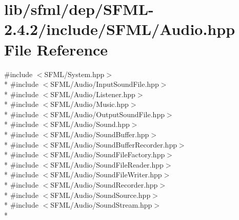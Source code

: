 \hypertarget{sfml_2dep_2_s_f_m_l-2_84_82_2include_2_s_f_m_l_2_audio_8hpp}{\section{lib/sfml/dep/\-S\-F\-M\-L-\/2.4.2/include/\-S\-F\-M\-L/\-Audio.hpp File Reference}
\label{sfml_2dep_2_s_f_m_l-2_84_82_2include_2_s_f_m_l_2_audio_8hpp}
}
{\ttfamily \#include $<$S\-F\-M\-L/\-System.\-hpp$>$}\\*
{\ttfamily \#include $<$S\-F\-M\-L/\-Audio/\-Input\-Sound\-File.\-hpp$>$}\\*
{\ttfamily \#include $<$S\-F\-M\-L/\-Audio/\-Listener.\-hpp$>$}\\*
{\ttfamily \#include $<$S\-F\-M\-L/\-Audio/\-Music.\-hpp$>$}\\*
{\ttfamily \#include $<$S\-F\-M\-L/\-Audio/\-Output\-Sound\-File.\-hpp$>$}\\*
{\ttfamily \#include $<$S\-F\-M\-L/\-Audio/\-Sound.\-hpp$>$}\\*
{\ttfamily \#include $<$S\-F\-M\-L/\-Audio/\-Sound\-Buffer.\-hpp$>$}\\*
{\ttfamily \#include $<$S\-F\-M\-L/\-Audio/\-Sound\-Buffer\-Recorder.\-hpp$>$}\\*
{\ttfamily \#include $<$S\-F\-M\-L/\-Audio/\-Sound\-File\-Factory.\-hpp$>$}\\*
{\ttfamily \#include $<$S\-F\-M\-L/\-Audio/\-Sound\-File\-Reader.\-hpp$>$}\\*
{\ttfamily \#include $<$S\-F\-M\-L/\-Audio/\-Sound\-File\-Writer.\-hpp$>$}\\*
{\ttfamily \#include $<$S\-F\-M\-L/\-Audio/\-Sound\-Recorder.\-hpp$>$}\\*
{\ttfamily \#include $<$S\-F\-M\-L/\-Audio/\-Sound\-Source.\-hpp$>$}\\*
{\ttfamily \#include $<$S\-F\-M\-L/\-Audio/\-Sound\-Stream.\-hpp$>$}\\*
